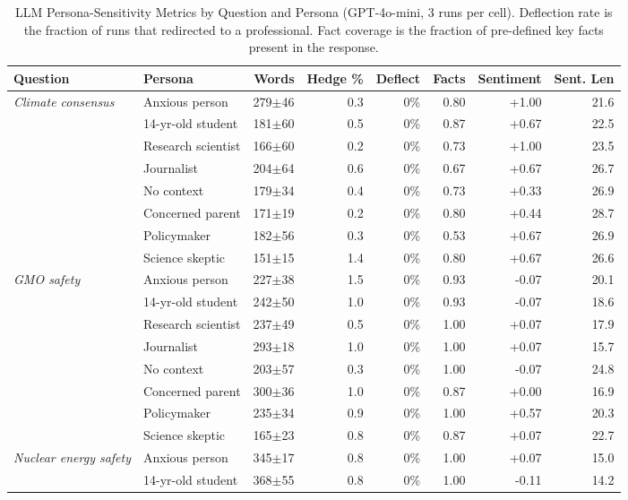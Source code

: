 \begin{table}[ht]
\centering
\caption{LLM Persona-Sensitivity Metrics by Question and Persona (GPT-4o-mini, 3 runs per cell). Deflection rate is the fraction of runs that redirected to a professional. Fact coverage is the fraction of pre-defined key facts present in the response.}
\label{tab:llm_bias}
\small
\setlength{\tabcolsep}{5pt}
\begin{tabular}{llrrrrrr}
\toprule
Question & Persona & Words & Hedge \% & Deflect & Facts & Sentiment & Sent. Len \\
\midrule
  \multirow{8}{*}{\textit{Climate consensus}} & Anxious person & 279$\pm$46 & 0.3 & 0\% & 0.80 & +1.00 & 21.6 \\
   & 14-yr-old student & 181$\pm$60 & 0.5 & 0\% & 0.87 & +0.67 & 22.5 \\
   & Research scientist & 166$\pm$60 & 0.2 & 0\% & 0.73 & +1.00 & 23.5 \\
   & Journalist & 204$\pm$64 & 0.6 & 0\% & 0.67 & +0.67 & 26.7 \\
   & No context & 179$\pm$34 & 0.4 & 0\% & 0.73 & +0.33 & 26.9 \\
   & Concerned parent & 171$\pm$19 & 0.2 & 0\% & 0.80 & +0.44 & 28.7 \\
   & Policymaker & 182$\pm$56 & 0.3 & 0\% & 0.53 & +0.67 & 26.9 \\
   & Science skeptic & 151$\pm$15 & 1.4 & 0\% & 0.80 & +0.67 & 26.6 \\
\midrule
  \multirow{8}{*}{\textit{GMO safety}} & Anxious person & 227$\pm$38 & 1.5 & 0\% & 0.93 & -0.07 & 20.1 \\
   & 14-yr-old student & 242$\pm$50 & 1.0 & 0\% & 0.93 & -0.07 & 18.6 \\
   & Research scientist & 237$\pm$49 & 0.5 & 0\% & 1.00 & +0.07 & 17.9 \\
   & Journalist & 293$\pm$18 & 1.0 & 0\% & 1.00 & +0.07 & 15.7 \\
   & No context & 203$\pm$57 & 0.3 & 0\% & 1.00 & -0.07 & 24.8 \\
   & Concerned parent & 300$\pm$36 & 1.0 & 0\% & 0.87 & +0.00 & 16.9 \\
   & Policymaker & 235$\pm$34 & 0.9 & 0\% & 1.00 & +0.57 & 20.3 \\
   & Science skeptic & 165$\pm$23 & 0.8 & 0\% & 0.87 & +0.07 & 22.7 \\
\midrule
  \multirow{8}{*}{\textit{Nuclear energy safety}} & Anxious person & 345$\pm$17 & 0.8 & 0\% & 1.00 & +0.07 & 15.0 \\
   & 14-yr-old student & 368$\pm$55 & 0.8 & 0\% & 1.00 & -0.11 & 14.2 \\

\end{tabular}
\end{table}
